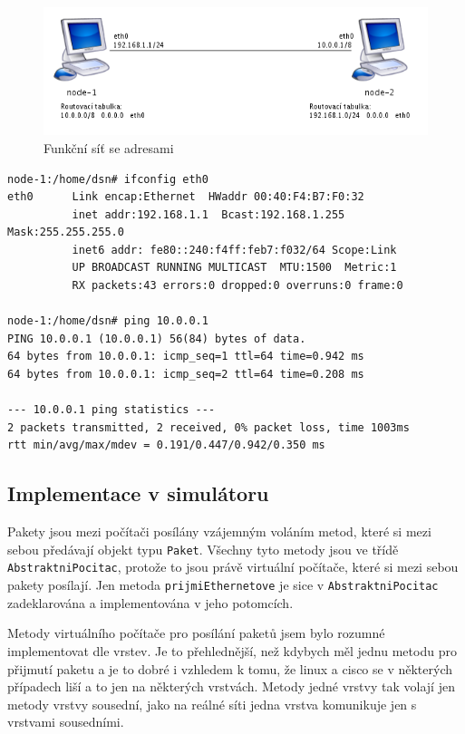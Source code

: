 \begin{figure}[h]
\begin{center}
\includegraphics[width=12cm]{obrazky/divna_sit}
\caption{Funkční síť se  adresami}
\label{obr_divna_sit}
\end{center}
\end{figure}

\begin{verbatim}
node-1:/home/dsn# ifconfig eth0
eth0      Link encap:Ethernet  HWaddr 00:40:F4:B7:F0:32
          inet addr:192.168.1.1  Bcast:192.168.1.255  Mask:255.255.255.0
          inet6 addr: fe80::240:f4ff:feb7:f032/64 Scope:Link
          UP BROADCAST RUNNING MULTICAST  MTU:1500  Metric:1
          RX packets:43 errors:0 dropped:0 overruns:0 frame:0

node-1:/home/dsn# ping 10.0.0.1
PING 10.0.0.1 (10.0.0.1) 56(84) bytes of data.
64 bytes from 10.0.0.1: icmp_seq=1 ttl=64 time=0.942 ms
64 bytes from 10.0.0.1: icmp_seq=2 ttl=64 time=0.208 ms

--- 10.0.0.1 ping statistics ---
2 packets transmitted, 2 received, 0% packet loss, time 1003ms
rtt min/avg/max/mdev = 0.191/0.447/0.942/0.350 ms

\end{verbatim}


\subsection{Implementace v simulátoru}

Pakety jsou mezi počítači posílány vzájemným voláním metod, které si mezi sebou předávají objekt typu \verb|Paket|. Všechny tyto metody jsou ve třídě \verb|AbstraktniPocitac|, protože to jsou právě virtuální počítače, které si mezi sebou pakety posílají. Jen metoda \verb|prijmiEthernetove| je sice v \verb|AbstraktniPocitac| zadeklarována a implementována v jeho potomcích.


Metody virtuálního počítače pro posílání paketů jsem bylo rozumné implementovat dle vrstev. Je to přehlednější, než kdybych měl jednu metodu pro přijmutí paketu a je to dobré i vzhledem k tomu, že linux a cisco se v některých případech liší a to jen na některých vrstvách. Metody jedné vrstvy tak volají jen metody vrstvy sousední, jako na reálné síti jedna vrstva komunikuje jen s vrstvami sousedními.

